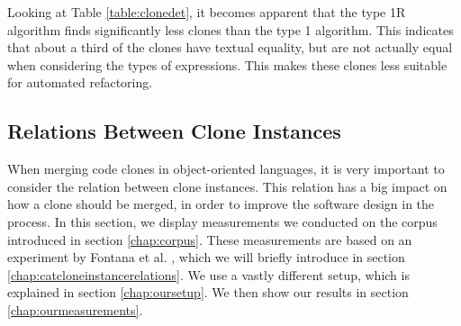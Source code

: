 \documentclass[a4paper]{article}
\begin{document}
Looking at Table \ref{table:clonedet}, it becomes apparent that the type 1R algorithm finds significantly less clones than the type 1 algorithm. This indicates that about a third of the clones have textual equality, but are not actually equal when considering the types of expressions. This makes these clones less suitable for automated refactoring.

\subsection{Relations Between Clone Instances} \label{chap:relationsinstances}
When merging code clones in object-oriented languages, it is very important to consider the relation between clone instances. This relation has a big impact on how a clone should be merged, in order to improve the software design in the process. In this section, we display measurements we conducted on the corpus introduced in section \ref{chap:corpus}. These measurements are based on an experiment by Fontana et al. \cite{fontana2015duplicated}, which we will briefly introduce in section \ref{chap:catcloneinstancerelations}. We use a vastly different setup, which is explained in section \ref{chap:oursetup}. We then show our results in section \ref{chap:ourmeasurements}.
\end{document}

